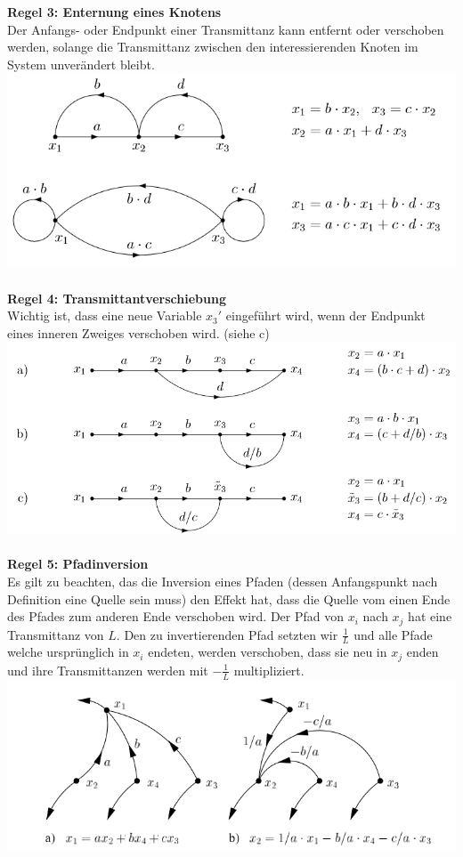 \noindent\textbf{Regel 3: Enternung eines Knotens}\\
 Der Anfangs- oder Endpunkt einer Transmittanz kann entfernt
oder verschoben werden, solange die Transmittanz zwischen
den interessierenden Knoten im System unverändert bleibt.\\
\includegraphics[width=\columnwidth]{Images/sfd_r3}~\\

\noindent\textbf{Regel 4: Transmittantverschiebung}\\
 Wichtig ist, dass eine neue Variable $x_3'$ eingeführt wird, wenn
der Endpunkt eines inneren Zweiges verschoben wird. (siehe c)\\
\includegraphics[width=\columnwidth]{Images/sfd_r4}~\\

\noindent\textbf{Regel 5: Pfadinversion}\\
 Es gilt zu beachten, das die Inversion eines Pfaden (dessen
Anfangspunkt nach Definition eine Quelle sein muss) den Effekt
hat, dass die Quelle vom einen Ende des Pfades zum
anderen Ende verschoben wird. Der Pfad von $x_i$ nach $x_j$ hat
eine Transmittanz von $L$. Den zu invertierenden Pfad setzten
wir $\frac{1}{L}$ und alle Pfade welche ursprünglich in $x_i$ endeten,
werden verschoben, dass sie neu in $x_j$ enden und ihre Transmittanzen
werden mit $-\frac{1}{L}$ multipliziert.\\
\includegraphics[width=\columnwidth]{Images/sfd_r5}~\\


